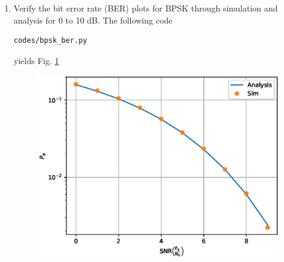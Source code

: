 \documentclass[journal,12pt,twocolumn]{IEEEtran}
\renewcommand\thesection{\arabic{section}}
\begin{document}
\begin{enumerate}[label=\thesection.\arabic*.,ref=\thesection.\theenumi]
\item
Verify the bit error rate (BER) plots for BPSK through simulation and analysis for 0 to 10 dB.
\solution
The following code
\begin{lstlisting}
codes/bpsk_ber.py
\end{lstlisting}
yields Fig. \ref{fig:ee18btech11042_bpsk_ber}
\begin{figure}[!ht]
\centering
\includegraphics[width=\columnwidth]{./figs/bpsk_ber.eps}
\caption{}
\label{fig:ee18btech11042_bpsk_ber}
\end{figure}


\end{enumerate}
\end{document}
